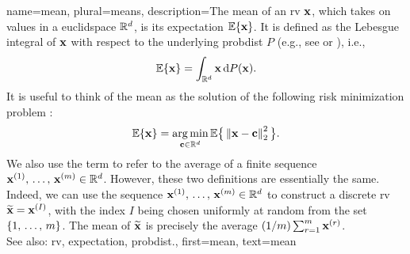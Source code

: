 {name={mean}, plural={means},
	description={The  mean of an \gls{rv} ${\bf x}$, which takes 
 		on values in a \gls{euclidspace} $\mathbb{R}^{d}$, is its 
 		\gls{expectation} $\mathbb{E}\{{\bf x}\}$. It is defined as the Lebesgue 
 		integral of ${\bf x}$ with respect to the underlying \gls{probdist} $P$ (e.g., 
		see \cite{RudinBookPrinciplesMatheAnalysis} or \cite{BillingsleyProbMeasure}), i.e.,
		\[
			\mathbb{E}\{{\bf x}\} = \int_{\mathbb{R}^{d}} {\bf x} \, \mathrm{d}P({\bf x}).
		\] 
		It is useful to think of the mean as the solution of the following \gls{risk} 
		minimization problem \cite{BertsekasProb}:
		\[
			\mathbb{E}\{{\bf x}\} = \operatorname*{arg\,min}_{{\bf c} \in \mathbb{R}^{d}} 
			\mathbb{E} \big\{\left\Vert {{\bf x}- {\bf c}} \right\Vert_{2}^{2}\big \}.
		\] 
		We also use the term to refer to the average of a finite sequence 
		${\bf x}^{(1)}, \,\ldots, \,{\bf x}^{(m)} \in \mathbb{R}^{d}$. However, 
		these two definitions are essentially the same. Indeed, we can use the sequence 
		${\bf x}^{(1)}, \,\ldots, \,{\bf x}^{(m)} \in \mathbb{R}^{d}$ to construct a 
		discrete \gls{rv} $\widetilde{{\bf x}}={\bf x}^{(I)}$, with the index $I$ being chosen uniformly 
		at random from the set $\{1, \,\ldots, \,m\}$. The mean of $\widetilde{{\bf x}}$ is 
		precisely the average $({1}/{m}) \sum_{r=1}^{m} {\bf x}^{(r)}$.
			\\ 
		See also: \gls{rv}, \gls{expectation}, \gls{probdist}.}, 
	first={mean}, 
	text={mean} 
}

